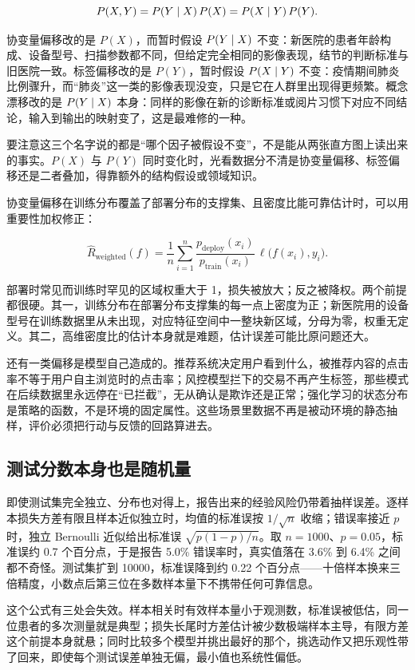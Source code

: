 \[
P(X,Y)=P(Y\mid X)\,P(X)=P(X\mid Y)\,P(Y).
\]

协变量偏移改的是 \(P(X)\)，而暂时假设 \(P(Y\mid X)\) 不变：新医院的患者年龄构成、设备型号、扫描参数都不同，但给定完全相同的影像表现，结节的判断标准与旧医院一致。标签偏移改的是 \(P(Y)\)，暂时假设 \(P(X\mid Y)\) 不变：疫情期间肺炎比例骤升，而``肺炎''这一类的影像表现没变，只是它在人群里出现得更频繁。概念漂移改的是 \(P(Y\mid X)\) 本身：同样的影像在新的诊断标准或阅片习惯下对应不同结论，输入到输出的映射变了，这是最难修的一种。

要注意这三个名字说的都是``哪个因子被假设不变''，不是能从两张直方图上读出来的事实。\(P(X)\) 与 \(P(Y)\) 同时变化时，光看数据分不清是协变量偏移、标签偏移还是二者叠加，得靠额外的结构假设或领域知识。

协变量偏移在训练分布覆盖了部署分布的支撑集、且密度比能可靠估计时，可以用重要性加权修正：

\[
\widehat R_{\mathrm{weighted}}(f)=\frac1n\sum_{i=1}^n\frac{p_{\mathrm{deploy}}(x_i)}{p_{\mathrm{train}}(x_i)}\,\ell\bigl(f(x_i),y_i\bigr).
\]

部署时常见而训练时罕见的区域权重大于 1，损失被放大；反之被降权。两个前提都很硬。其一，训练分布在部署分布支撑集的每一点上密度为正；新医院用的设备型号在训练数据里从未出现，对应特征空间中一整块新区域，分母为零，权重无定义。其二，高维密度比的估计本身就是难题，估计误差可能比原问题还大。

还有一类偏移是模型自己造成的。推荐系统决定用户看到什么，被推荐内容的点击率不等于用户自主浏览时的点击率；风控模型拦下的交易不再产生标签，那些模式在后续数据里永远停在``已拦截''，无从确认是欺诈还是正常；强化学习的状态分布是策略的函数，不是环境的固定属性。这些场景里数据不再是被动环境的静态抽样，评价必须把行动与反馈的回路算进去。

\subsection{测试分数本身也是随机量}

即使测试集完全独立、分布也对得上，报告出来的经验风险仍带着抽样误差。逐样本损失方差有限且样本近似独立时，均值的标准误按 \(1/\sqrt n\) 收缩；错误率接近 \(p\) 时，独立 Bernoulli 近似给出标准误 \(\sqrt{p(1-p)/n}\)。取 \(n=1000\)、\(p=0.05\)，标准误约 0.7 个百分点，于是报告 5.0\% 错误率时，真实值落在 3.6\% 到 6.4\% 之间都不奇怪。测试集扩到 10000，标准误降到约 0.22 个百分点——十倍样本换来三倍精度，小数点后第三位在多数样本量下不携带任何可靠信息。

这个公式有三处会失效。样本相关时有效样本量小于观测数，标准误被低估，同一位患者的多次测量就是典型；损失长尾时方差估计被少数极端样本主导，有限方差这个前提本身就悬；同时比较多个模型并挑出最好的那个，挑选动作又把乐观性带了回来，即使每个测试误差单独无偏，最小值也系统性偏低。

